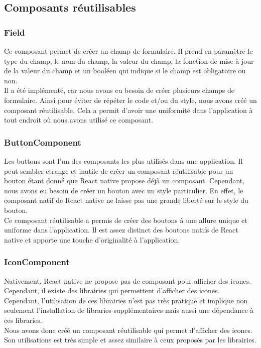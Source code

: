 \documentclass[12pt]{article}
\begin{document}
    \subsection{Composants réutilisables}{\label{subsec:comp}}

    \subsubsection{Field}{\label{subsubsec:field}}
    Ce composant permet de créer un champ de formulaire. Il prend en paramètre le type du champ, le nom du champ,
    la valeur du champ, la fonction de mise à jour de la valeur du champ et un booléen qui indique si le champ est
    obligatoire ou non.\\
    Il a été implémenté, car nous avons eu besoin de créer plusieurs champs de formulaire. Ainsi pour éviter de
    répéter le code et/ou du style, nous avons créé un composant réutilisable. Cela a permit d'avoir une uniformité
    dans l'application à tout endroit où nous avons utilisé ce composant.\\

    \subsubsection{ButtonComponent}{\label{subsubsec:button}}
    Les buttons sont l'un des composants les plus utilisés dans une application. Il peut sembler etrange et inutile
    de créer un composant réutilisable pour un bouton étant donné que React native propose déjà un composant. Cependant,
    nous avons eu besoin de créer un bouton avec un style particulier. En effet, le composant natif de React native
    ne laisse pas une grande liberté sur le style du bouton.\\
    Ce composant réutilisable a permis de créer des boutons à une allure unique et uniforme dans l'application. Il est
    assez distinct des boutons natifs de React native et apporte une touche d'originalité à l'application.\\

    \subsubsection{IconComponent}{\label{subsubsec:icon}}
    Nativement, React native ne propose pas de composant pour afficher des icones. Cependant, il existe des librairies
    qui permettent d'afficher des icones. Cependant, l'utilisation de ces librairies n'est pas très pratique et
    implique non seulement l'installation de libraries supplémentaires mais aussi une dépendance à ces libraries.\\
    Nous avons donc créé un composant réutilisable qui permet d'afficher des icones. Son utilisations est très simple
    et assez similaire à ceux proposés par les librairies.\\
\end{document}
